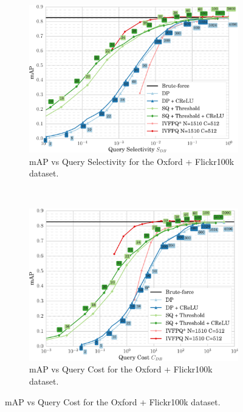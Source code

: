 %
\begin{figure}
\ContinuedFloat
\begin{subfigure}{\linewidth}
\centering
\caption{\centering mAP vs Query Selectivity for the Oxford + Flickr100k dataset.}%
\includegraphics[width=\linewidth,height=0.39\textheight,keepaspectratio]{plot_Oxford_Flickr100k_QSelectivity}
\end{subfigure}\\[4ex]
\begin{subfigure}{\linewidth}
\centering
\caption{\centering mAP vs Query Cost for the Oxford + Flickr100k dataset.}%
\includegraphics[width=\linewidth,height=0.39\textheight,keepaspectratio]{plot_Oxford_Flickr100k_QCost}
\end{subfigure}


\end{figure}

